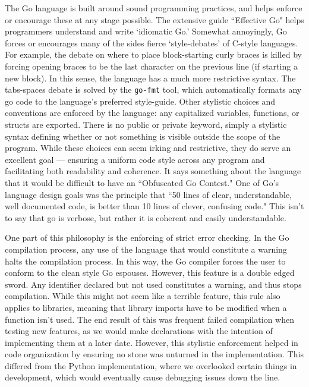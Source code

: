 \documentclass[12pt, letterpaper]{article}
\begin{document}
The Go language is built around sound programming practices, and helps 
enforce or encourage these at any stage possible. The extensive guide 
``Effective Go" helps programmers understand and write `idiomatic Go.' 
Somewhat annoyingly, Go forces or encourages many of the sides fierce 
`style-debates' of C-style languages. For example, the debate on where 
to place block-starting curly braces is killed by forcing opening 
braces to be the last character on the previous line (if starting a new 
block). In this sense, the language has a much more restrictive syntax. 
The tabs-spaces debate is solved by the \verb+go-fmt+ tool, which 
automatically formats any go code to the language's preferred 
style-guide. Other stylistic choices and conventions are enforced by 
the language: any capitalized variables, functions, or structs are 
exported. There is no public or private keyword, simply a stylistic 
syntax defining whether or not something is visible outside the scope 
of the program. While these choices can seem irking and restrictive, 
they do serve an excellent goal --- ensuring a uniform code style 
across any program and facilitating both readability and coherence. It 
says something about the language that it would be difficult to have an 
``Obfuscated Go Contest." One of Go's language design goals was the 
principle that ``50 lines of clear, understandable, well documented 
code, is better than 10 lines of clever, confusing code." This isn't to 
say that go is verbose, but rather it is coherent and easily 
understandable.

One part of this philosophy is the enforcing of strict error checking. 
In the Go compilation process, any use of the language that would 
constitute a warning halts the compilation process. In this way, the Go 
compiler forces the user to conform to the clean style Go espouses. 
However, this feature is a double edged sword. Any identifier declared 
but not used constitutes a warning, and thus stops compilation. While 
this might not seem like a terrible feature, this rule also applies to 
libraries, meaning that library imports have to be modified when a 
function isn't used. The end result of this was frequent failed 
compilation when testing new features, as we would make declarations 
with the intention of implementing them at a later date. However, this 
stylistic enforcement helped in code organization by ensuring no stone 
was unturned in the implementation. This differed from the Python 
implementation, where we overlooked certain things in development, 
which would eventually cause debugging issues down the line. 
\end{document}
